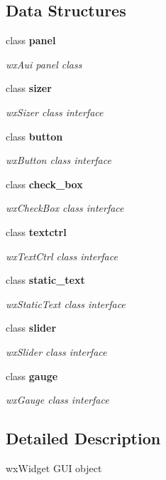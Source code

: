 \subsection*{Data Structures}
\begin{DoxyCompactItemize}
\item 
class \textbf{ panel}
\begin{DoxyCompactList}\small\item\em wx\+Aui panel class \end{DoxyCompactList}\item 
class \textbf{ sizer}
\begin{DoxyCompactList}\small\item\em wx\+Sizer class interface \end{DoxyCompactList}\item 
class \textbf{ button}
\begin{DoxyCompactList}\small\item\em wx\+Button class interface \end{DoxyCompactList}\item 
class \textbf{ check\+\_\+box}
\begin{DoxyCompactList}\small\item\em wx\+Check\+Box class interface \end{DoxyCompactList}\item 
class \textbf{ textctrl}
\begin{DoxyCompactList}\small\item\em wx\+Text\+Ctrl class interface \end{DoxyCompactList}\item 
class \textbf{ static\+\_\+text}
\begin{DoxyCompactList}\small\item\em wx\+Static\+Text class interface \end{DoxyCompactList}\item 
class \textbf{ slider}
\begin{DoxyCompactList}\small\item\em wx\+Slider class interface \end{DoxyCompactList}\item 
class \textbf{ gauge}
\begin{DoxyCompactList}\small\item\em wx\+Gauge class interface \end{DoxyCompactList}\end{DoxyCompactItemize}


\subsection{Detailed Description}
wx\+Widget G\+UI object 

